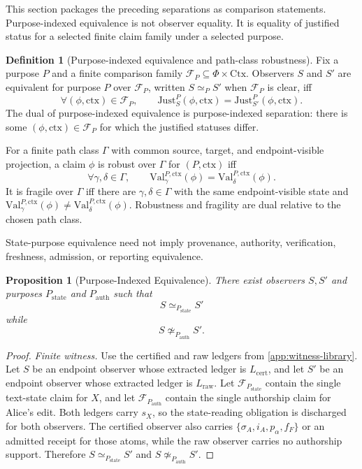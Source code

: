 \documentclass[11pt,twoside]{article}
\newtheorem{proposition}[theorem]{Proposition}
\theoremstyle{definition}
\newtheorem{definition}[theorem]{Definition}
\newcommand{\Just}{\mathrm{Just}}
\newcommand{\Val}{\mathrm{Val}}
\newcommand{\ctx}{\mathrm{ctx}}
\begin{document}
This section packages the preceding separations as comparison statements.
Purpose-indexed equivalence is not observer equality. It is equality of
justified status for a selected finite claim family under a selected purpose.

\begin{definition}[Purpose-indexed equivalence and path-class robustness]
Fix a purpose $P$ and a finite comparison family
$\mathcal F_P\subseteq\Phi\times\mathrm{Ctx}$. Observers $S$ and $S'$ are
equivalent for purpose $P$ over $\mathcal F_P$, written $S\simeq_P S'$ when
$\mathcal F_P$ is clear, iff
\[
  \forall(\phi,\ctx)\in\mathcal F_P,\qquad
  \Just_S^P(\phi,\ctx)=\Just_{S'}^P(\phi,\ctx).
\]
The dual of purpose-indexed equivalence is purpose-indexed separation: there is
some $(\phi,\ctx)\in\mathcal F_P$ for which the justified statuses differ.

For a finite path class $\Gamma$ with common source, target, and
endpoint-visible projection, a claim $\phi$ is robust over $\Gamma$ for
$(P,\ctx)$ iff
\[
  \forall\gamma,\delta\in\Gamma,\qquad
  \Val_\gamma^{P,\ctx}(\phi)=\Val_\delta^{P,\ctx}(\phi).
\]
It is fragile over $\Gamma$ iff there are $\gamma,\delta\in\Gamma$ with the
same endpoint-visible state and
$\Val_\gamma^{P,\ctx}(\phi)\neq\Val_\delta^{P,\ctx}(\phi)$. Robustness and
fragility are dual relative to the chosen path class.
\end{definition}

State-purpose equivalence need not imply provenance, authority, verification,
freshness, admission, or reporting equivalence.

\begin{proposition}[Purpose-Indexed Equivalence]
\label{prop:purpose-indexed-equivalence}
There exist observers $S,S'$ and purposes $P_{\mathrm{state}}$ and
$P_{\mathrm{auth}}$ such that
\[
  S\simeq_{P_{\mathrm{state}}}S'
\]
while
\[
  S\not\simeq_{P_{\mathrm{auth}}}S'.
\]
\end{proposition}

\begin{proof}
\textit{Finite witness.}
Use the certified and raw ledgers from \cref{app:witness-library}. Let $S$ be
an endpoint observer whose extracted ledger is $L_{\mathrm{cert}}$, and let
$S'$ be an endpoint observer whose extracted ledger is $L_{\mathrm{raw}}$. Let
$\mathcal F_{P_{\mathrm{state}}}$ contain the single text-state claim for
$X$, and let $\mathcal F_{P_{\mathrm{auth}}}$ contain the single authorship
claim for Alice's edit. Both ledgers carry $s_X$, so the state-reading
obligation is discharged for both observers. The certified observer also
carries $\{\sigma_A,i_A,p_\alpha,f_F\}$ or an admitted receipt for those atoms,
while the raw observer carries no authorship support. Therefore
$S\simeq_{P_{\mathrm{state}}}S'$ and
$S\not\simeq_{P_{\mathrm{auth}}}S'$.
\end{proof}
\end{document}
